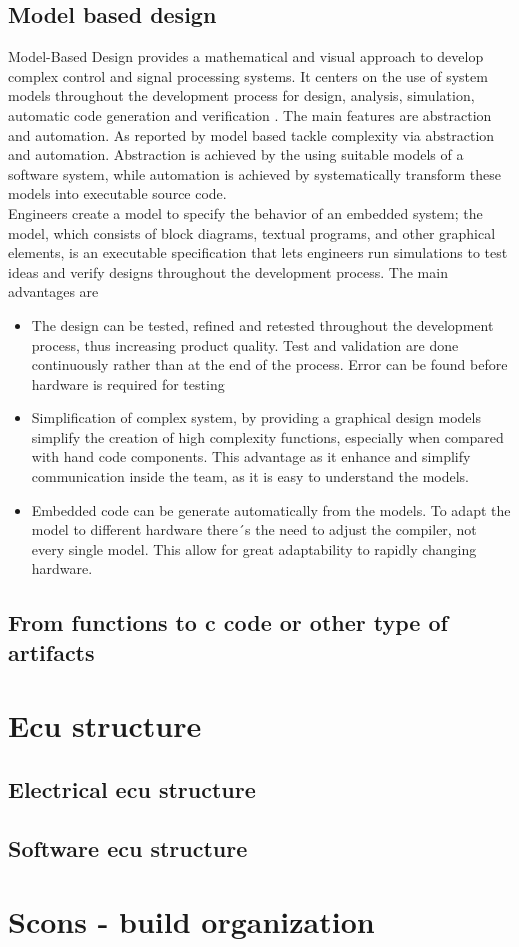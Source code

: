 \documentclass[../main.tex]{subfiles}
\begin{document}
\subsection{Model based design}
Model-Based Design provides a mathematical and visual approach to develop complex control and signal processing systems. It centers on the use of system models throughout the development process for design, analysis, simulation, automatic code generation and verification \cite{Mathworks}. The main features are abstraction and automation. As reported by \cite{modelbased} model based tackle complexity via abstraction and automation. Abstraction is achieved by the using suitable models of a software system, while automation is achieved by systematically transform these models into executable source code.\\
Engineers create a model to specify the behavior of an embedded system; the model, which consists of block diagrams, textual programs, and other graphical elements, is an executable specification that lets engineers run simulations to test ideas and verify designs throughout the development process. The main advantages are
\begin{itemize}
    \item The design can be tested, refined and retested throughout the development process, thus increasing product quality. Test and validation are done continuously rather than at the end of the process. Error can be found before hardware is required for testing
    \item Simplification of complex system, by providing a graphical design models simplify the creation of high complexity functions, especially when compared with hand code components. This advantage as it enhance and simplify communication inside the team, as it is easy to understand the models. 
    \item Embedded code can be generate automatically from the models. To adapt the model to different hardware there´s the need to adjust the compiler, not every single model. This allow for great adaptability to rapidly changing hardware. 
\end{itemize}
\subsection{From functions to c code or other type of artifacts}
\section{Ecu structure}
\subsection{Electrical ecu structure}
\subsection{Software ecu structure}
\section{Scons - build organization}

\cleardoublepage
\end{document}
